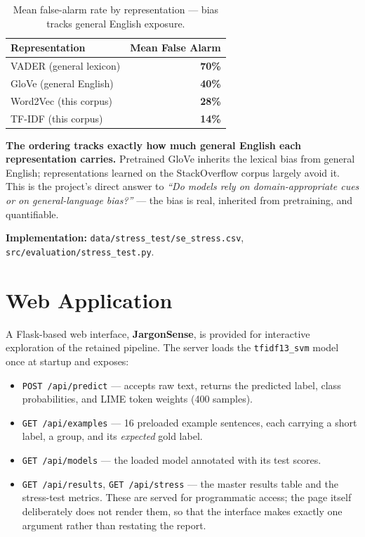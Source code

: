 \documentclass[11pt,a4paper]{article}
\begin{document}
\begin{table}[H]
\centering
\caption{Mean false-alarm rate by representation --- bias tracks general English exposure.}
\label{tab:bias}
\begin{tabular}{lr}
\toprule
\textbf{Representation} & \textbf{Mean False Alarm} \\
\midrule
VADER (general lexicon)      & \textbf{70\%} \\
GloVe (general English)      & \textbf{40\%} \\
Word2Vec (this corpus)       & \textbf{28\%} \\
TF-IDF (this corpus)         & \textbf{14\%} \\
\bottomrule
\end{tabular}
\end{table}

\textbf{The ordering tracks exactly how much general English each representation carries.} Pretrained GloVe inherits the lexical bias from general English; representations learned on the StackOverflow corpus largely avoid it. This is the project's direct answer to \textit{``Do models rely on domain-appropriate cues or on general-language bias?''} --- the bias is real, inherited from pretraining, and quantifiable.

\textbf{Implementation:} \texttt{data/stress\_test/se\_stress.csv}, \texttt{src/evaluation/stress\_test.py}.

\section{Web Application}
\label{sec:webapp}

A Flask-based web interface, \textbf{JargonSense}, is provided for interactive
exploration of the retained pipeline. The server loads the
\texttt{tfidf13\_svm} model once at startup and exposes:

\begin{itemize}[leftmargin=*]
    \item \texttt{POST /api/predict} --- accepts raw text, returns the predicted label, class probabilities, and LIME token weights (400 samples).
    \item \texttt{GET /api/examples} --- 16 preloaded example sentences, each carrying a short label, a group, and its \textit{expected} gold label.
    \item \texttt{GET /api/models} --- the loaded model annotated with its test scores.
    \item \texttt{GET /api/results}, \texttt{GET /api/stress} --- the master results table and the stress-test metrics. These are served for programmatic access; the page itself deliberately does not render them, so that the interface makes exactly one argument rather than restating the report.
\end{itemize}
\end{document}
